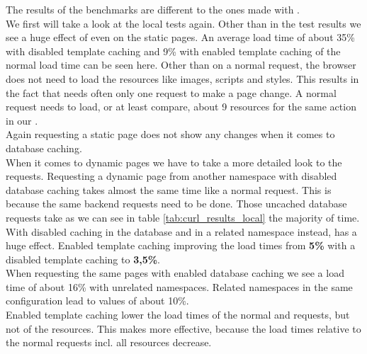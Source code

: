 The results of the \selenium{} \webdriver{} benchmarks are different to the ones made with \curl{}.
\\
We first will take a look at the local tests again.
Other than in the \curl{} test results we see a huge effect of \lare{} even on the static pages.
An average \lare{} load time of about 35\% with disabled template caching and 9\% with enabled template caching of the normal load time can be seen here.
Other than on a normal request, the browser does not need to load the resources like images, scripts and styles.
This results in the fact that \lare{} needs often only one request to make a page change.
A normal request needs to load, or at least compare, about 9 resources for the same action in our \webApplication{}.
\\
Again requesting a static page does not show any changes when it comes to database caching.
\\
When it comes to dynamic pages we have to take a more detailed look to the requests.
Requesting a dynamic page from another \lare{} namespace with disabled database caching takes almost the same time like a normal request.
This is because the same backend requests need to be done.
Those uncached database requests take as we can see in table \ref{tab:curl_results_local} the majority of time.
\\
With disabled caching in the database and in a related namespace instead, \lare{} has a huge effect.
Enabled template caching improving the load times from \textbf{5\%} with a disabled template caching to \textbf{3,5\%}.
\\
When requesting the same pages with enabled database caching we see a \lare{} load time of about 16\% with unrelated namespaces.
Related namespaces in the same configuration lead to values of about 10\%.
\\
Enabled template caching lower the load times of the normal and \lare{} requests, but not of the resources.
This makes \lare{} more effective, because the load times relative to the normal requests incl. all resources decrease.





